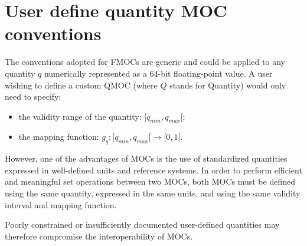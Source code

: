 \section{User define quantity MOC conventions\label{sec:udmoc1}}

The conventions adopted for FMOCs are generic and could be applied to any quantity
$q$ numerically represented as a 64-bit floating-point value.
A user wishing to define a custom QMOC (where $Q$ stands for Quantity) would only need to specify:
\begin{itemize}
  \item the validity range of the quantity: $[q_{min}, q_{max}[$;
  \item the mapping function: $g_q: [q_{min}, q_{max}[ \rightarrow [0,1[$.
\end{itemize}

However, one of the advantages of MOCs is the use of standardized quantities expressed
in well-defined units and reference systems.
In order to perform efficient and meaningful set operations between two MOCs, both MOCs must
be defined using the same quantity, expressed in the same units, and using
the same validity interval and mapping function.

Poorly constrained or insufficiently documented user-defined quantities may therefore compromise the interoperability of MOCs.
